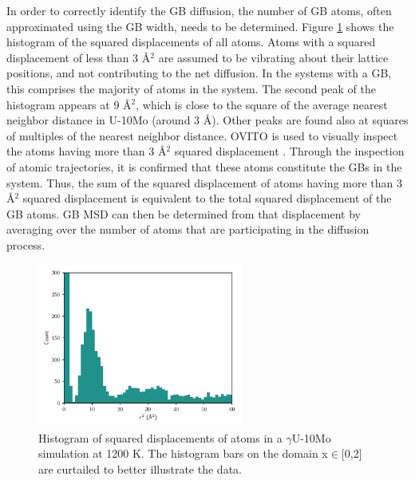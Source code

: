 \documentclass{elsarticle}
\begin{document}
In order to correctly identify the GB diffusion, the number of GB atoms, often approximated using the GB width, needs to be determined. Figure \ref{fig:hist} shows the histogram of the squared displacements of all atoms. Atoms with a squared displacement of less than $3$ \r{A}$^2$ are assumed to be vibrating about their lattice positions, and not contributing to the net diffusion. In the systems with a GB, this comprises the majority of atoms in the system. The second peak of the histogram appears at $9$ \r{A}$^2$, which is close to the square of the average nearest neighbor distance in U-10Mo (around $3$ \r{A}). Other peaks are found also at squares of multiples of the nearest neighbor distance. OVITO is used to visually inspect the atoms having more than $3$ \r{A}$^2$ squared displacement \cite{ovito}. Through the inspection of atomic trajectories, it is confirmed that these atoms constitute the GBs in the system. Thus, the sum of the squared displacement of atoms having more than $3$ \r{A}$^2$ squared displacement is equivalent to the total squared displacement of the GB atoms. GB MSD can then be determined from that displacement by averaging over the number of atoms that are participating in the diffusion process.

\begin{figure}[!ht]
\centering
\includegraphics[width=0.60\textwidth]{histogram.pdf}
\caption{Histogram of squared displacements of atoms in a $\gamma$U-10Mo simulation at 1200 K. The histogram bars on the domain x$\in$[0,2] are curtailed to better illustrate the data.}
\label{fig:hist}
\end{figure}
\end{document}
